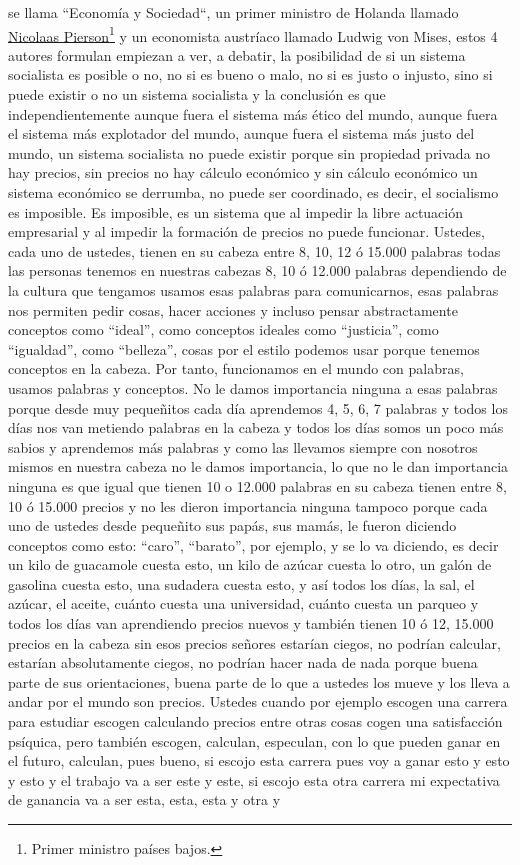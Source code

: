 se llama ``Economía y Sociedad``\citep{weber1921economy}, un primer ministro de Holanda llamado \href{https://en.wikipedia.org/wiki/Nicolaas_Pierson}{Nicolaas Pierson}\footnote{Primer ministro países bajos.} y un economista austríaco llamado Ludwig von Mises, estos 4 autores formulan empiezan a ver, a debatir, la posibilidad de si un sistema socialista es posible o no, no si es bueno o malo, no si es justo o injusto, sino si puede existir o no un sistema socialista y la conclusión es que independientemente aunque fuera el sistema más ético del mundo, aunque fuera el sistema más explotador del mundo, aunque fuera el sistema más justo del mundo, un sistema socialista no puede existir porque sin propiedad privada no hay precios, sin precios no hay cálculo económico y sin cálculo económico un sistema económico se derrumba, no puede ser coordinado, es decir, el socialismo es imposible. Es imposible, es un sistema que al impedir la libre actuación empresarial y al impedir la formación de precios no puede funcionar. Ustedes, cada uno de ustedes, tienen en su cabeza entre 8, 10, 12 ó 15.000 palabras todas las personas tenemos en nuestras cabezas 8, 10 ó 12.000 palabras dependiendo de la cultura que tengamos usamos esas palabras para comunicarnos, esas palabras nos permiten pedir cosas, hacer acciones y incluso pensar abstractamente conceptos como \enquote{ideal}, como conceptos ideales como \enquote{justicia}, como \enquote{igualdad}, como \enquote{belleza}, cosas por el estilo podemos usar porque tenemos conceptos en la cabeza. Por tanto, funcionamos en el mundo con palabras, usamos palabras y conceptos. No le damos importancia ninguna a esas palabras porque desde muy pequeñitos cada día aprendemos 4, 5, 6, 7 palabras y todos los días nos van metiendo palabras en la cabeza y todos los días somos un poco más sabios y aprendemos más palabras y como las llevamos siempre con nosotros mismos en nuestra cabeza no le damos importancia, lo que no le dan importancia ninguna es que igual que tienen 10 o 12.000 palabras en su cabeza tienen entre 8, 10 ó 15.000 precios y no les dieron importancia ninguna tampoco porque cada uno de ustedes desde pequeñito sus papás, sus mamás, le fueron diciendo conceptos como esto: \enquote{caro}, \enquote{barato}, por ejemplo, y se lo va diciendo, es decir un kilo de guacamole cuesta esto, un kilo de azúcar cuesta lo otro, un galón de gasolina cuesta esto, una sudadera cuesta esto, y así todos los días, la sal, el azúcar, el aceite, cuánto cuesta una universidad, cuánto cuesta un parqueo y todos los días van aprendiendo precios nuevos y también tienen 10 ó 12, 15.000 precios en la cabeza sin esos precios señores estarían ciegos, no podrían calcular, estarían absolutamente ciegos, no podrían hacer nada de nada porque buena parte de sus orientaciones, buena parte de lo que a ustedes los mueve y los lleva a andar por el mundo son precios. Ustedes cuando por ejemplo escogen una carrera para estudiar escogen calculando precios entre otras cosas cogen una satisfacción psíquica, pero también escogen, calculan, especulan, con lo que pueden ganar en el futuro, calculan, pues bueno, si escojo esta carrera pues voy a ganar esto y esto y esto y el trabajo va a ser este y este, si escojo esta otra carrera mi expectativa de ganancia va a ser esta, esta, esta y otra y 